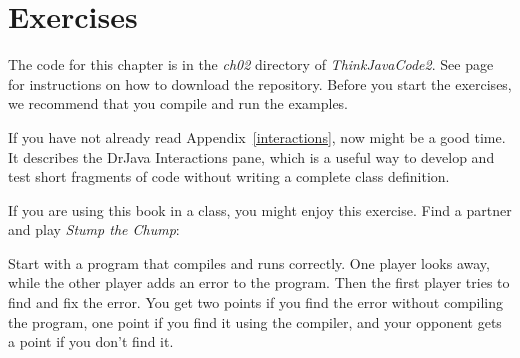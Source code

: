 \section{Exercises}

The code for this chapter is in the {\it ch02} directory of {\it ThinkJavaCode2}.
See page~\pageref{code} for instructions on how to download the repository.
Before you start the exercises, we recommend that you compile and run the examples.

If you have not already read Appendix~\ref{interactions}, now might be a good time.
It describes the DrJava Interactions pane, which is a useful way to develop and test short fragments of code without writing a complete class definition.


\begin{exercise}  %

If you are using this book in a class, you might enjoy this exercise.
Find a partner and play {\it Stump the Chump}:

Start with a program that compiles and runs correctly.
One player looks away, while the other player adds an error to the program.
Then the first player tries to find and fix the error.
You get two points if you find the error without compiling the program, one point if you find it using the compiler, and your opponent gets a point if you don't find it.

\end{exercise}


